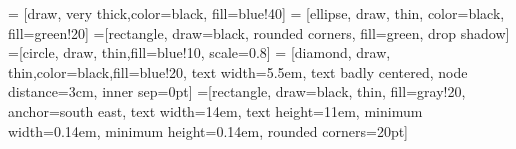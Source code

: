 \usetikzlibrary{positioning,arrows,shapes,shadows}
 = [draw, very thick,color=black, fill=blue!40]
 = [ellipse, draw, thin, color=black, fill=green!20]
=[rectangle, draw=black, rounded corners, fill=green, drop shadow]
=[circle, draw, thin,fill=blue!10, scale=0.8]
 = [diamond, draw, thin,color=black,fill=blue!20,
    text width=5.5em, text badly centered, node distance=3cm, inner sep=0pt]
    =[rectangle, draw=black, thin, fill=gray!20,
                                 anchor=south east, text width=14em,
                                 text height=11em, minimum width=0.14em,
                                 minimum height=0.14em, rounded
                                 corners=20pt]


